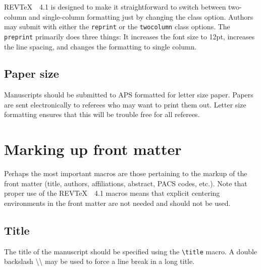 \documentclass[twocolumn,secnumarabic,amssymb, nobibnotes, aps, prd]{revtex4-1}
\newcommand{\revtex}{REV\TeX\ }
\newcommand{\classoption}[1]{\texttt{#1}}
\newcommand{\macro}[1]{\texttt{\textbackslash#1}}
\newcommand{\m}[1]{\macro{#1}}
\begin{document}
\revtex\ 4.1 is designed to
make it straightforward to switch between two-column and single-column
formatting just by changing the class option. Authors may submit with
either the \classoption{reprint} or the \classoption{twocolumn} class options.
The \classoption{preprint} primarily does three things: It increases
the font size to 12pt, increases the line spacing, and changes the
formatting to single column.

\subsection{Paper size}
Manuscripts should be submitted to APS formatted for letter size
paper. Papers are sent electronically to referees who may
want to print them out. Letter size formatting ensures that this will
be trouble free for all referees.

\section{Marking up front matter}
Perhaps the most important macros are those 
pertaining to the markup of the front matter (title, authors,
affiliations, abstract, PACS codes, etc.). Note that proper
use of the \revtex\ 4.1 macros means that explicit centering environments
in the front matter are not needed and should not be used.

\subsection{Title}
The title of the manuscript should be specified using the \m{title} macro. A
double backslash {\textbackslash\textbackslash} may be used to force a line break in a long
title.
\end{document}
